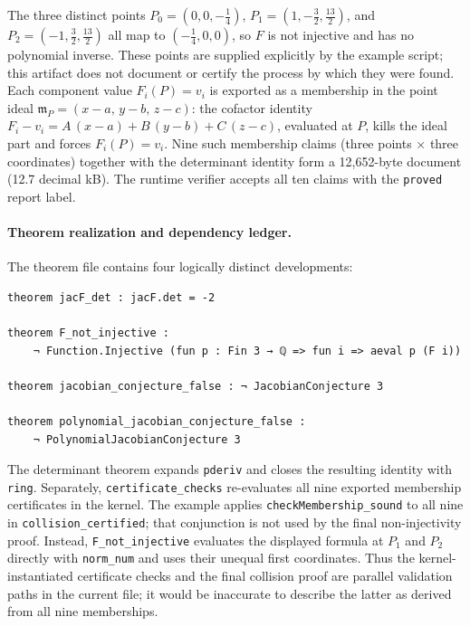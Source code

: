 \documentclass[11pt]{article}
\newcommand{\proved}{\textcolor{okgreen}{\code{proved}}}
\newcommand{\code}[1]{\texttt{#1}}
\begin{document}
The three distinct points $P_0=(0,0,-\tfrac14)$,
$P_1=(1,-\tfrac32,\tfrac{13}2)$, and $P_2=(-1,\tfrac32,\tfrac{13}2)$
all map to $(-\tfrac14,0,0)$, so $F$ is not injective and has no
polynomial inverse.  These points are supplied explicitly by the
example script; this artifact does not document or certify the process
by which they were found.  Each component value $F_i(P)=v_i$ is
exported as a membership in the point ideal
$\mathfrak m_P=(x-a,\,y-b,\,z-c)$: the cofactor identity
$F_i-v_i = A\,(x-a)+B\,(y-b)+C\,(z-c)$, evaluated at $P$, kills the
ideal part and forces $F_i(P)=v_i$.  Nine such membership claims
(three points $\times$ three coordinates) together with the
determinant identity form a 12,652-byte document (12.7 decimal kB).
The runtime verifier accepts all ten claims with the \proved{} report
label.

\paragraph{Theorem realization and dependency ledger.}
The theorem file contains four logically distinct developments:
\begin{lstlisting}[style=leanstyle]
theorem jacF_det : jacF.det = -2

theorem F_not_injective :
    ¬ Function.Injective (fun p : Fin 3 → ℚ => fun i => aeval p (F i))

theorem jacobian_conjecture_false : ¬ JacobianConjecture 3

theorem polynomial_jacobian_conjecture_false :
    ¬ PolynomialJacobianConjecture 3
\end{lstlisting}

The determinant theorem expands \code{pderiv} and closes the resulting
identity with \code{ring}.  Separately,
\code{certificate\_checks} re-evaluates all nine exported membership
certificates in the kernel.  The example applies
\code{checkMembership\_sound} to all nine in
\code{collision\_certified}; that conjunction is not used by the final
non-injectivity proof.  Instead, \code{F\_not\_injective} evaluates the
displayed formula at $P_1$ and $P_2$ directly with \code{norm\_num} and
uses their unequal first coordinates.  Thus the kernel-instantiated
certificate checks and the final collision proof are parallel validation
paths in the current file; it would be inaccurate to describe the latter
as derived from all nine memberships.
\end{document}
